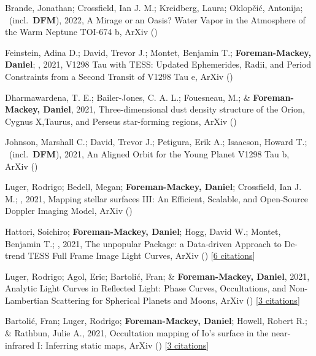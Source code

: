 \item[{\color{numcolor}\scriptsize12}] Brande, Jonathan; Crossfield, Ian J. M.; Kreidberg, Laura; Oklop{\v{c}}i{\'c}, Antonija; \etal\ (incl.\ \textbf{DFM}), 2022, A Mirage or an Oasis? Water Vapor in the Atmosphere of the Warm Neptune TOI-674 b, ArXiv ()

\item[{\color{numcolor}\scriptsize11}] Feinstein, Adina D.; David, Trevor J.; Montet, Benjamin T.; \textbf{Foreman-Mackey, Daniel}; \etal, 2021, V1298 Tau with TESS: Updated Ephemerides, Radii, and Period Constraints from a Second Transit of V1298 Tau e, ArXiv ()

\item[{\color{numcolor}\scriptsize10}] Dharmawardena, T. E.; Bailer-Jones, C. A. L.; Fouesneau, M.; \& \textbf{Foreman-Mackey, Daniel}, 2021, Three-dimensional dust density structure of the Orion, Cygnus X,Taurus, and Perseus star-forming regions, ArXiv ()

\item[{\color{numcolor}\scriptsize9}] Johnson, Marshall C.; David, Trevor J.; Petigura, Erik A.; Isaacson, Howard T.; \etal\ (incl.\ \textbf{DFM}), 2021, An Aligned Orbit for the Young Planet V1298 Tau b, ArXiv ()

\item[{\color{numcolor}\scriptsize8}] Luger, Rodrigo; Bedell, Megan; \textbf{Foreman-Mackey, Daniel}; Crossfield, Ian J. M.; \etal, 2021, Mapping stellar surfaces III: An Efficient, Scalable, and Open-Source Doppler Imaging Model, ArXiv ()

\item[{\color{numcolor}\scriptsize7}] Hattori, Soichiro; \textbf{Foreman-Mackey, Daniel}; Hogg, David W.; Montet, Benjamin T.; \etal, 2021, The unpopular Package: a Data-driven Approach to De-trend TESS Full Frame Image Light Curves, ArXiv () [\href{https://ui.adsabs.harvard.edu/abs/2021arXiv210615063H}{6 citations}]

\item[{\color{numcolor}\scriptsize6}] Luger, Rodrigo; Agol, Eric; Bartoli{\'c}, Fran; \& \textbf{Foreman-Mackey, Daniel}, 2021, Analytic Light Curves in Reflected Light: Phase Curves, Occultations, and Non-Lambertian Scattering for Spherical Planets and Moons, ArXiv () [\href{https://ui.adsabs.harvard.edu/abs/2021arXiv210306275L}{3 citations}]

\item[{\color{numcolor}\scriptsize5}] Bartoli{\'c}, Fran; Luger, Rodrigo; \textbf{Foreman-Mackey, Daniel}; Howell, Robert R.; \& Rathbun, Julie A., 2021, Occultation mapping of Io's surface in the near-infrared I: Inferring static maps, ArXiv () [\href{https://ui.adsabs.harvard.edu/abs/2021arXiv210303758B}{3 citations}]

